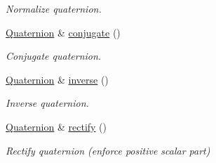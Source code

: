 \begin{DoxyCompactItemize}
\begin{DoxyCompactList}\small\item\em Normalize quaternion. \end{DoxyCompactList}\item 
\hyperlink{classlibrary_1_1math_1_1geom_1_1trf_1_1rot_1_1_quaternion}{Quaternion} \& \hyperlink{classlibrary_1_1math_1_1geom_1_1trf_1_1rot_1_1_quaternion_a4c584b96ce248b069a85adb1c5abd74c}{conjugate} ()
\begin{DoxyCompactList}\small\item\em Conjugate quaternion. \end{DoxyCompactList}\item 
\hyperlink{classlibrary_1_1math_1_1geom_1_1trf_1_1rot_1_1_quaternion}{Quaternion} \& \hyperlink{classlibrary_1_1math_1_1geom_1_1trf_1_1rot_1_1_quaternion_a596228c41391cbba85ca425d9c7c3dbd}{inverse} ()
\begin{DoxyCompactList}\small\item\em Inverse quaternion. \end{DoxyCompactList}\item 
\hyperlink{classlibrary_1_1math_1_1geom_1_1trf_1_1rot_1_1_quaternion}{Quaternion} \& \hyperlink{classlibrary_1_1math_1_1geom_1_1trf_1_1rot_1_1_quaternion_a41cbb9a19380bd08110455190a0a9770}{rectify} ()
\begin{DoxyCompactList}\small\item\em Rectify quaternion (enforce positive scalar part) \end{DoxyCompactList}\end{DoxyCompactItemize}
